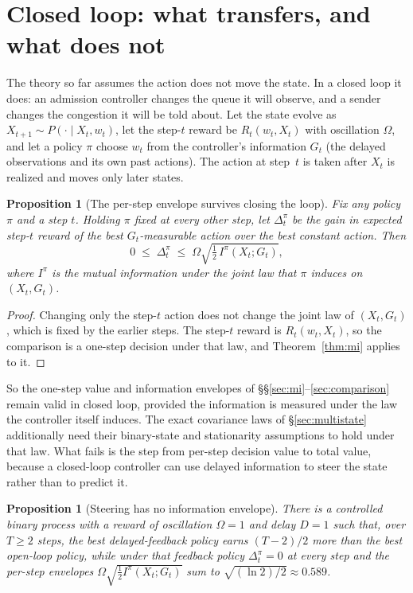 \documentclass[11pt]{article}
\newtheorem{proposition}[theorem]{Proposition}
\begin{document}
\section{Closed loop: what transfers, and what does not}\label{sec:closedloop}

The theory so far assumes the action does not move the state. In a
closed loop it does: an admission controller changes the queue it will
observe, and a sender changes the congestion it will be told about. Let the
state evolve as $X_{t+1}\sim P(\cdot\mid X_t,w_t)$, let the step-$t$ reward be
$R_t(w_t,X_t)$ with oscillation $\Omega$, and let a policy $\pi$ choose $w_t$ from
the controller's information $G_t$ (the delayed observations and its own
past actions). The action at step~$t$ is taken after $X_t$ is realized and
moves only later states.

\begin{proposition}[The per-step envelope survives closing the loop]\label{prop:clstep}
Fix any policy $\pi$ and a step $t$. Holding $\pi$ fixed at every other step, let
$\Delta^\pi_t$ be the gain in expected step-$t$ reward of the best
$G_t$-measurable action over the best constant action. Then
\[
0\;\le\;\Delta^\pi_t\;\le\;\Omega\sqrt{\tfrac12\,I^\pi(X_t;G_t)},
\]
where $I^\pi$ is the mutual information under the joint law that $\pi$
induces on $(X_t,G_t)$.
\end{proposition}

\begin{proof}
Changing only the step-$t$ action does not change the joint law of
$(X_t,G_t)$, which is fixed by the earlier steps. The step-$t$ reward is
$R_t(w_t,X_t)$, so the comparison is a one-step decision under that law,
and Theorem~\ref{thm:mi} applies to it.
\end{proof}

So the one-step value and information envelopes of \S\S\ref{sec:mi}--\ref{sec:comparison}
remain valid in closed loop, provided the information is measured under
the law the controller itself induces. The exact covariance laws of
\S\ref{sec:multistate} additionally need their binary-state and
stationarity assumptions to hold under that law. What fails is the step from per-step decision
value to total value, because a closed-loop controller can use delayed
information to steer the state rather than to predict it.

\begin{proposition}[Steering has no information envelope]\label{prop:clsteer}
There is a controlled binary process with a reward of oscillation
$\Omega=1$ and delay $D=1$ such that, over $T\ge2$ steps, the best delayed-feedback
policy earns $(T-2)/2$ more than the best open-loop policy, while under that
feedback policy $\Delta^\pi_t=0$ at every step and the per-step envelopes
$\Omega\sqrt{\tfrac12 I^\pi(X_t;G_t)}$ sum to $\sqrt{(\ln 2)/2}\approx0.589$.
\end{proposition}
\end{document}
